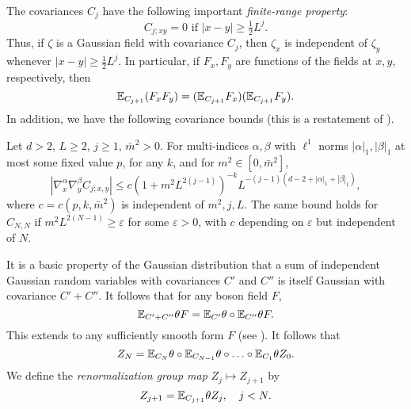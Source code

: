The covariances $C_j$ have the following important \emph{finite-range property}:
\begin{equation}
C_{j;xy} = 0 \text{ if } |x - y| \ge \tfrac12 L^j.
\end{equation}
Thus, if $\zeta$ is a Gaussian field with covariance $C_j$, then $\zeta_x$ is independent
of $\zeta_y$ whenever $|x - y| \ge \tfrac12 L^j$. In particular,
if $F_x, F_y$ are functions of the fields at $x, y$, respectively, then
\begin{equation}
\label{e:uncorr}
\mathbb{E}_{C_{j+1}} (F_x F_y) = (\mathbb{E}_{C_{j+1}} F_x) (\mathbb{E}_{C_{j+1}} F_y).
\end{equation}
In addition, we have the following covariance bounds (this is a restatement of
\cite[Proposition~\ref{pt-prop:Cdecomp}(a)]{BBS-rg-pt}).

\begin{prop}
\label{prop:Cdecomp}
  Let $d >2$, $L\geq 2$, $j \ge 1$, $\bar m^2 >0$.
  For multi-indices $\alpha,\beta$ with
  $\ell^1$ norms $|\alpha|_1,|\beta|_1$ at most
  some fixed value $p$,
  for any $k$, and for $m^2 \in [0,\bar m^2]$,
  \begin{equation}
    \label{e:scaling-estimate}
    |\nabla_x^\alpha \nabla_y^\beta C_{j;x,y}|
    \leq c(1+m^2L^{2(j-1)})^{-k}
    L^{-(j-1)(d-2 +|\alpha|_1+|\beta|_1)},
  \end{equation}
  where $c=c(p,k,\bar m^2)$ is independent of $m^2,j,L$.
  The same bound holds for $C_{N,N}$ if
  $m^2L^{2(N-1)} \ge \varepsilon$ for some $\varepsilon >0$,
  with $c$ depending on $\varepsilon$ but independent of $N$.
\end{prop}


It is a basic property  of the Gaussian distribution that a sum of independent Gaussian random
variables with covariances
$C'$ and $C''$ is itself Gaussian with covariance $C' + C''$. It follows that for any
boson field $F$,
\begin{equation}
\mathbb{E}_{C'+C''}\theta F = \mathbb{E}_{C'}\theta \circ \mathbb{E}_{C''}\theta F.
\end{equation}
This extends to any sufficiently smooth form $F$ (see \cite{BS-rg-norm}).
It follows that
\begin{equation}
\label{e:prog-int}
Z_N =
\mathbb{E}_{C_N}\theta \circ \mathbb{E}_{C_{N-1}}\theta \circ \ldots \circ \mathbb{E}_{C_1}\theta Z_0.
\end{equation}
We define the \emph{renormalization group map} $Z_j \mapsto Z_{j+1}$ by
\begin{equation}
\label{e:rgmapZ}
Z_{j+1} = \mathbb{E}_{C_{j+1}} \theta Z_j, \quad j < N.
\end{equation}

